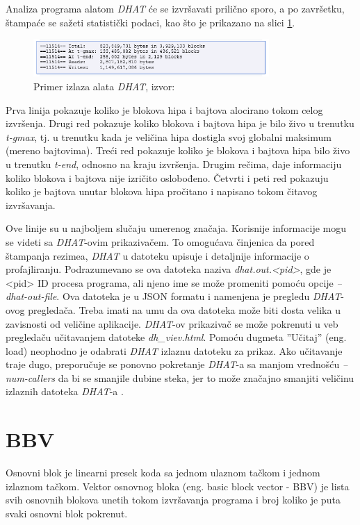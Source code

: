 \documentclass[12pt,oneside]{memoir}
\theoremstyle{plain}
\theoremstyle{definition}
\begin{document}
Analiza programa alatom \textit{DHAT} će se izvršavati prilično sporo, a po završetku, štampaće se sažeti statistički podaci, kao što je prikazano na slici \ref{fig:slika2.24}.
\begin{figure}[!ht]
  \centering
  \includegraphics[width=0.8\textwidth]{DHAT.png}
  \caption{Primer izlaza alata \textit{DHAT}, izvor: \cite{DHAT}}
  \label{fig:slika2.24}
\end{figure}

Prva linija pokazuje koliko je blokova hipa i bajtova alocirano tokom celog izvršenja. Drugi red pokazuje koliko blokova i bajtova hipa je bilo živo u trenutku \textit{t-gmax}, tj. u trenutku kada je veličina hipa dostigla svoj globalni maksimum (mereno bajtovima). Treći red pokazuje koliko je blokova i bajtova hipa bilo živo u trenutku \textit{t-end}, odnosno na kraju izvršenja. Drugim rečima, daje informaciju koliko blokova i bajtova nije izričito oslobođeno. Četvrti i peti red pokazuju koliko je bajtova unutar blokova hipa pročitano i napisano tokom čitavog izvršavanja.

Ove linije su u najboljem slučaju umerenog značaja. Korisnije informacije mogu se videti sa \textit{DHAT}-ovim prikazivačem. To omogućava činjenica da pored štampanja rezimea, \textit{DHAT} u datoteku upisuje i detaljnije informacije o profajliranju. Podrazumevano se ova datoteka naziva \textit{dhat.out.<pid>}, gde je <pid> ID procesa programa, ali njeno ime se može promeniti pomoću opcije \textit{--dhat-out-file}. Ova datoteka je u JSON formatu i namenjena je pregledu \textit{DHAT}-ovog pregledača. Treba imati na umu da ova datoteka može biti dosta velika u zavisnosti od veličine aplikacije. 
\textit{DHAT}-ov prikazivač se može pokrenuti u veb pregledaču učitavanjem datoteke \textit{dh\_viev.html}. Pomoću dugmeta ''Učitaj'' (eng. load) neophodno je odabrati \textit{DHAT} izlaznu datoteku za prikaz. Ako učitavanje traje dugo, preporučuje se ponovno pokretanje \textit{DHAT}-a sa manjom vrednošću \textit{--num-callers} da bi se smanjile dubine steka, jer to može značajno smanjiti veličinu izlaznih datoteka \textit{DHAT}-a \cite{DHAT}. 

\section{BBV}
Osnovni blok je linearni presek koda sa jednom ulaznom tačkom i jednom izlaznom tačkom. Vektor osnovnog bloka (eng. basic block vector - BBV) je lista svih osnovnih blokova unetih tokom izvršavanja programa i broj koliko je puta svaki osnovni blok pokrenut.
\end{document}
